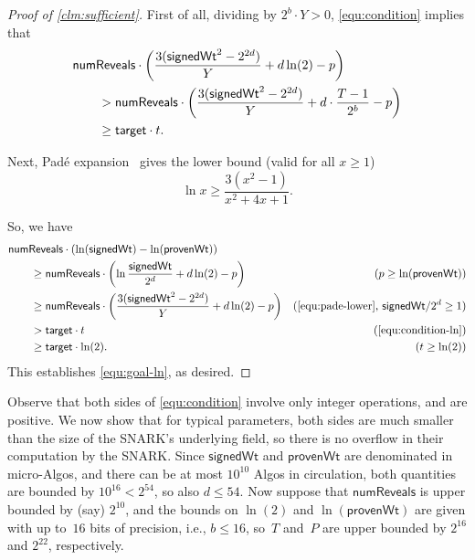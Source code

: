 \documentclass[11pt,hidelinks]{article}
\newcommand{\numreveals}{\mathsf{numReveals}}
\newcommand{\sigwt}{\mathsf{signedWt}}
\newcommand{\provwt}{\mathsf{provenWt}}
\newcommand{\target}{\mathsf{target}}
\begin{document}
\begin{proof}[Proof of \cref{clm:sufficient}]
First of all, dividing by $2^b \cdot Y > 0$, \cref{equ:condition} implies that
\begin{align}
    \MoveEqLeft \numreveals \cdot \left( \frac{3(\sigwt^2 - 2^{2d})}{Y} + d\ln(2) - p\right) \nonumber \\
    &>  \numreveals \cdot \left( \frac{3(\sigwt^2 - 2^{2d})}{Y} + d \cdot \frac{T - 1}{2^b} - p\right) \nonumber \\
    &\geq \target \cdot t. \label{equ:condition-ln}
\end{align}

Next, Pad{\'e} expansion~\cite[Table~3]{pade} gives the lower bound (valid for all $x \geq 1$)
\begin{equation}
    \label{equ:pade-lower}
    \ln x \geq \frac{3(x^2 - 1)}{x^2 + 4x + 1}.
\end{equation}

So, we have
 \begin{align*}
    \MoveEqLeft \numreveals \cdot (\ln(\sigwt) - \ln(\provwt)) \\
     &\geq \numreveals \cdot \left(\ln\frac{\sigwt}{2^d} + d\ln(2) - p\right) & \text{($p \geq \ln(\provwt)$)} \\
     &\geq \numreveals \cdot \left(\frac{3(\sigwt^2 - 2^{2d})}{Y} + d\ln(2) - p\right) & \text{(\cref{equ:pade-lower}, $\sigwt/2^d \geq 1$)} \\
     &> \target \cdot t & \text{(\cref{equ:condition-ln})} \\
     &\geq \target \cdot \ln(2). & \text{($t \geq \ln(2)$)}
\end{align*}
This establishes \cref{equ:goal-ln}, as desired.
\end{proof}
 
Observe that both sides of \cref{equ:condition} involve only integer operations, and are positive.
We now show that for typical parameters, both sides are much smaller than the size of the SNARK's underlying field, so there is no overflow in their computation by the SNARK.
Since $\sigwt$ and $\provwt$ are denominated in micro-Algos, and there can be at most $10^{10}$ Algos in circulation, both quantities are bounded by $10^{16} < 2^{54}$, so also $d \leq 54$.
Now suppose that $\numreveals$ is upper bounded by (say) $2^{10}$, and the bounds on $\ln(2)$ and $\ln(\provwt)$ are given with up to~$16$ bits of precision, i.e., $b \leq 16$, so~$T$ and~$P$ are upper bounded by $2^{16}$ and $2^{22}$, respectively.
\end{document}
